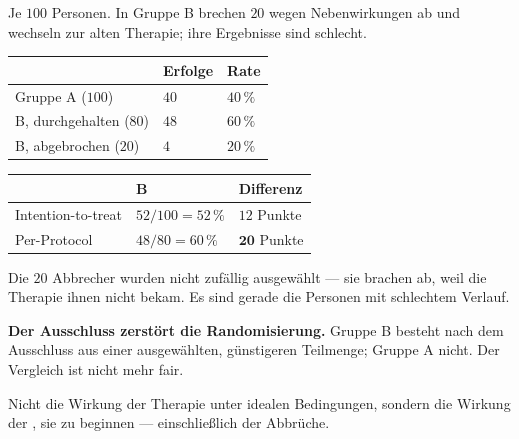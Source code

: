 \begin{merksatz}
Je $100$ Personen. In Gruppe B brechen $20$ wegen Nebenwirkungen ab und wechseln zur alten Therapie; ihre Ergebnisse sind schlecht.

\begin{center}
{\small
\renewcommand{\arraystretch}{1.48}
\begin{tabular}{@{}P{2.8cm}P{2.0cm}P{2.4cm}@{}}
\toprule
& \textbf{Erfolge} & \textbf{Rate}\\
\midrule
Gruppe A ($100$) & $40$ & $40\,\%$\\
\midrule
B, durchgehalten ($80$) & $48$ & $60\,\%$\\
B, abgebrochen ($20$) & $4$ & $20\,\%$\\
\bottomrule
\end{tabular}}
\end{center}

\begin{center}
\renewcommand{\arraystretch}{1.48}
\begin{tabular}{@{}P{2.6cm}P{2.2cm}P{2.6cm}@{}}
\toprule
& \textbf{B} & \textbf{Differenz}\\
\midrule
Intention-to-treat & $52/100 = 52\,\%$ & $12$ Punkte\\
Per-Protocol & $48/80 = 60\,\%$ & $\mathbf{20}$ Punkte\\
\bottomrule
\end{tabular}
\end{center}

Die $20$ Abbrecher wurden nicht zufällig ausgewählt --- sie brachen ab, weil die Therapie ihnen nicht bekam. Es sind gerade die Personen mit schlechtem Verlauf.

\begin{center}
\begin{minipage}{0.9\textwidth}
\textbf{Der Ausschluss zerstört die Randomisierung.} Gruppe B besteht nach dem Ausschluss aus einer ausgewählten, günstigeren Teilmenge; Gruppe A nicht. Der Vergleich ist nicht mehr fair.
\end{minipage}
\end{center}

Nicht die Wirkung der Therapie unter idealen Bedingungen, sondern die Wirkung der , sie zu beginnen --- einschließlich der Abbrüche.

\begin{center}
\begin{minipage}{0.88\textwidth}
\end{minipage}
\end{center}
\end{merksatz}

